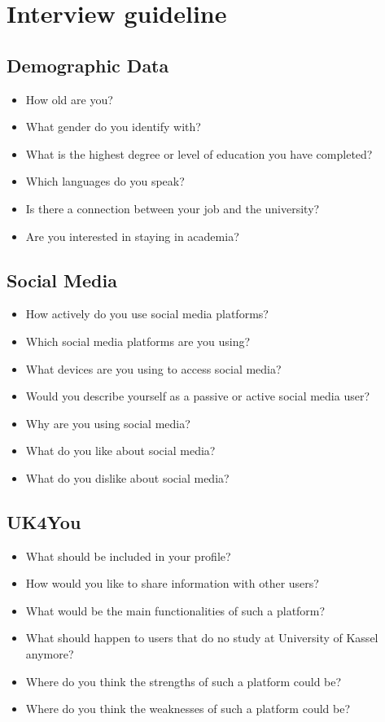 \section{Interview guideline}


\subsection{Demographic Data}
\begin{itemize}
    \item How old are you?
    \item What gender do you identify with?
    \item What is the highest degree or level of education you have completed?
    \item Which languages do you speak?
    \item Is there a connection between your job and the university?
    \item Are you interested in staying in academia?
\end{itemize}

\subsection{Social Media}
\begin{itemize}
    \item How actively do you use social media platforms?
    \item Which social media platforms are you using?
    \item What devices are you using to access social media?
    \item Would you describe yourself as a passive or active social media user?
    \item Why are you using social media?
    \item What do you like about social media?
    \item What do you dislike about social media?
\end{itemize}

\subsection{UK4You}
\begin{itemize}
    \item What should be included in your profile?
    \item How would you like to share information with other users?
    \item What would be the main functionalities of such a platform?
    \item What should happen to users that do no study at University of Kassel anymore?
    \item Where do you think the strengths of such a platform could be?
    \item Where do you think the weaknesses of such a platform could be?
\end{itemize}